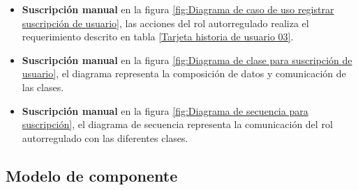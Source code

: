 \begin{itemize}

\item \textbf{Suscripción manual}
en la figura \ref{fig:Diagrama de caso de uso registrar suscripción de usuario},
las acciones del rol autorregulado realiza el requerimiento descrito en tabla
\ref{Tarjeta historia de usuario 03}.

\begin{minipage}{1.0\textwidth}
	\centering
	\label{fig:Diagrama de caso de uso registrar suscripción de usuario}
\end{minipage}

\item \textbf{Suscripción manual}
en la figura \ref{fig:Diagrama de clase para suscripción de usuario}, el diagrama
representa la composición de datos y comunicación de las clases.

\begin{minipage}{1.0\textwidth}
	\centering
	\label{fig:Diagrama de clase para suscripción de usuario}
\end{minipage}

\item \textbf{Suscripción manual}
en la figura \ref{fig:Diagrama de secuencia para suscripción}, el diagrama
de secuencia representa la comunicación del rol autorregulado con las
diferentes clases.

\begin{minipage}{1.0\textwidth}
	\centering
	\label{fig:Diagrama de secuencia para suscripción}
\end{minipage}

\end{itemize}

\subsection{Modelo de componente}

